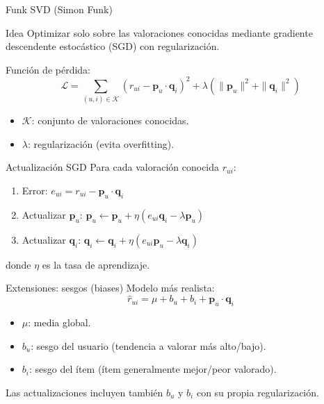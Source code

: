 \documentclass[aspectratio=169, 10pt, xcolor=table]{beamer}
\begin{document}
\begin{frame}{Funk SVD (Simon Funk)}
    \begin{block}{Idea}
        Optimizar solo sobre las valoraciones conocidas mediante gradiente descendente estocástico (SGD) con regularización.
    \end{block}
    Función de pérdida:
    \[
    \mathcal{L} = \sum_{(u,i) \in \mathcal{K}} (r_{ui} - \mathbf{p}_u \cdot \mathbf{q}_i)^2 + \lambda (\|\mathbf{p}_u\|^2 + \|\mathbf{q}_i\|^2)
    \]
    \begin{itemize}
        \item $\mathcal{K}$: conjunto de valoraciones conocidas.
        \item $\lambda$: regularización (evita overfitting).
    \end{itemize}
\end{frame}

\begin{frame}{Actualización SGD}
    Para cada valoración conocida $r_{ui}$:
    \begin{enumerate}
        \item Error: $e_{ui} = r_{ui} - \mathbf{p}_u \cdot \mathbf{q}_i$
        \item Actualizar $\mathbf{p}_u$: $\mathbf{p}_u \leftarrow \mathbf{p}_u + \eta (e_{ui} \mathbf{q}_i - \lambda \mathbf{p}_u)$
        \item Actualizar $\mathbf{q}_i$: $\mathbf{q}_i \leftarrow \mathbf{q}_i + \eta (e_{ui} \mathbf{p}_u - \lambda \mathbf{q}_i)$
    \end{enumerate}
    donde $\eta$ es la tasa de aprendizaje.
\end{frame}

\begin{frame}{Extensiones: sesgos (biases)}
    Modelo más realista:
    \[
    \hat{r}_{ui} = \mu + b_u + b_i + \mathbf{p}_u \cdot \mathbf{q}_i
    \]
    \begin{itemize}
        \item $\mu$: media global.
        \item $b_u$: sesgo del usuario (tendencia a valorar más alto/bajo).
        \item $b_i$: sesgo del ítem (ítem generalmente mejor/peor valorado).
    \end{itemize}
    Las actualizaciones incluyen también $b_u$ y $b_i$ con su propia regularización.
\end{frame}
\end{document}
